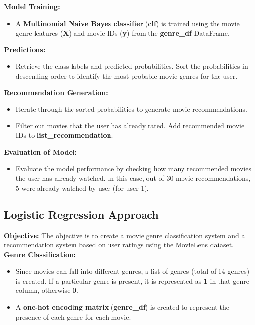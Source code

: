 \documentclass[a4paper]{article}
\theoremstyle{plain}
\theoremstyle{definition}
\begin{document}
        \textbf{Model Training:}
        \begin{itemize}
            \item A \textbf{Multinomial Naive Bayes classifier} (\textbf{clf}) is trained using the movie genre features (\textbf{X}) and movie IDs (\textbf{y}) from the \textbf{genre\_df} DataFrame.
        \end{itemize}
        
        \textbf{Predictions:}
        \begin{itemize}
            \item Retrieve the class labels and predicted probabilities. Sort the probabilities in descending order to identify the most probable movie genres for the user.
        \end{itemize}
        
        \textbf{Recommendation Generation:}
        \begin{itemize}
            \item Iterate through the sorted probabilities to generate movie recommendations.
            \item Filter out movies that the user has already rated. Add recommended movie IDs to \textbf{list\_recommendation}.
        \end{itemize}
        
        \textbf{Evaluation of Model:}
        \begin{itemize}
            \item Evaluate the model performance by checking how many recommended movies the user has already watched. In this case, out of 30 movie recommendations, 5 were already watched by user (for user 1).
        \end{itemize}

    \subsection{Logistic Regression Approach}
        
        \textbf{Objective:}
        The objective is to create a movie genre classification system and a recommendation system based on user ratings using the MovieLens dataset.\\
        
        \textbf{Genre Classification:}
        \begin{itemize}
            \item Since movies can fall into different genres, a list of genres (total of 14 genres) is created. If a particular genre is present, it is represented as \textbf{1} in that genre column, otherwise \textbf{0}.
            \item A \textbf{one-hot encoding matrix} (\textbf{genre\_df}) is created to represent the presence of each genre for each movie.
        \end{itemize}
        
\end{document}
